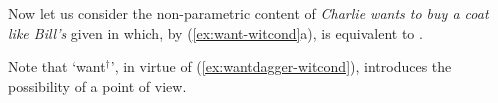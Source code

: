 Now let us consider the non-parametric content of \textit{Charlie
  wants to buy a coat like Bill's} given in  which, by
(\ref{ex:want-witcond}a), is equivalent to .
\begin{ex} 
\begin{subex} 
 
\item {} 
 
\item {} 
 
\end{subex} 
   
\end{ex} 
Note that `want$^\dagger$', in virtue of
(\ref{ex:wantdagger-witcond}), introduces the possibility of a point
of view.

